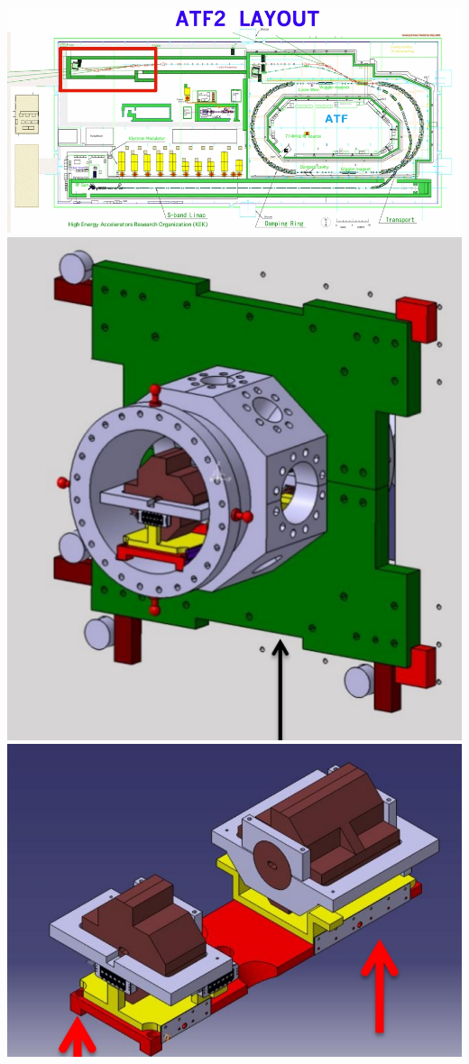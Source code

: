 \documentclass[a4paper,11pt]{book}
\begin{document}
\includegraphics[angle=0,scale=0.2]{ATF2layout33.jpg}
\hspace{1cm}
\includegraphics[angle=0,scale=0.16]{chambrevide.jpg}\\
\hspace*{1cm}\includegraphics[angle=0,scale=0.22]{BPMs01.jpg}\hspace*{0.2cm}
\end{document}
